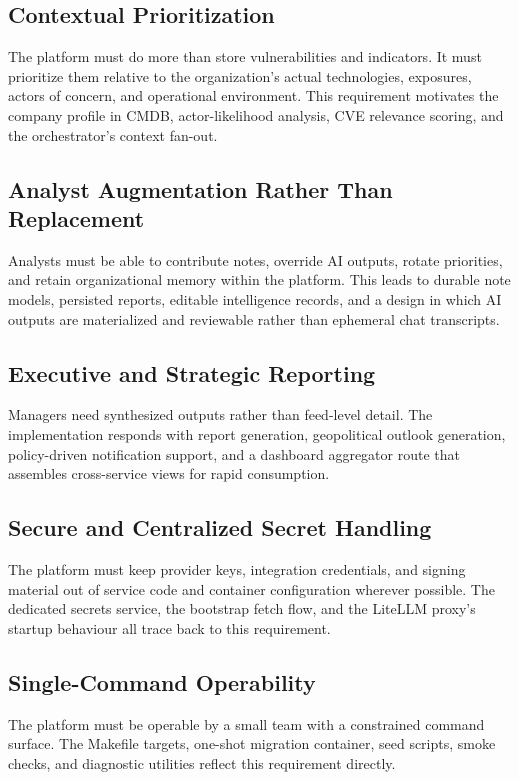 \subsection{Contextual Prioritization}
The platform must do more than store vulnerabilities and indicators. It must prioritize them relative to the organization's actual technologies, exposures, actors of concern, and operational environment. This requirement motivates the company profile in CMDB, actor-likelihood analysis, CVE relevance scoring, and the orchestrator's context fan-out.

\subsection{Analyst Augmentation Rather Than Replacement}
Analysts must be able to contribute notes, override AI outputs, rotate priorities, and retain organizational memory within the platform. This leads to durable note models, persisted reports, editable intelligence records, and a design in which AI outputs are materialized and reviewable rather than ephemeral chat transcripts.

\subsection{Executive and Strategic Reporting}
Managers need synthesized outputs rather than feed-level detail. The implementation responds with report generation, geopolitical outlook generation, policy-driven notification support, and a dashboard aggregator route that assembles cross-service views for rapid consumption.

\subsection{Secure and Centralized Secret Handling}
The platform must keep provider keys, integration credentials, and signing material out of service code and container configuration wherever possible. The dedicated secrets service, the bootstrap fetch flow, and the LiteLLM proxy's startup behaviour all trace back to this requirement.

\subsection{Single-Command Operability}
The platform must be operable by a small team with a constrained command surface. The Makefile targets, one-shot migration container, seed scripts, smoke checks, and diagnostic utilities reflect this requirement directly.

